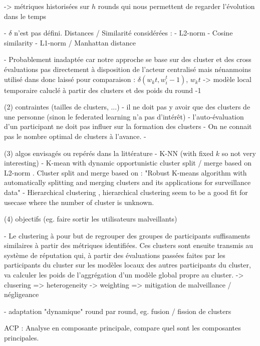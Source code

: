     -> métriques historisées sur $h$ rounds qui nous permettent de regarder l'évolution dans le temps
    
    - $\delta$ n'est pas défini. Distances / Similarité considérées :
        - L2-norm
        - Cosine similarity
        - L1-norm / Manhattan distance

    - Probablement inadaptée car notre approche se base sur des cluster et des cross évaluations pas directement à disposition de l'acteur centralisé mais nénanmoins utilisé dans \cite{wang_reputation-enabled_2021} donc laissé pour comparaison : $\delta (w_k^~t , w_i^t-1 )$, $w_k^~t$ -> modèle local temporaire caluclé à partir des clusters et des poids du round -1

(2) contraintes (tailles de clusters, ...)
    - il ne doit pas y avoir que des clusters de une personne (sinon le federated learning n'a pas d'intérêt)
    - l'auto-évaluation d'un participant ne doit pas influer sur la formation des clusters
    - On ne connait pas le nombre optimal de clusters à l'avance. 
    - 

(3) algos envisagés ou repérés dans la littérature
    - K-NN (with fixed $k$ so not very interesting)
    - K-mean with dynamic opportunistic cluster split / merge based on L2-norm \cite{chen_zero_2021}. Cluster split and merge based on : "Robust K-means algorithm with automatically splitting and merging clusters and its applications for surveillance data"
    - Hierarchical clustering \cite{briggs_federated_2020}, hierarchical clustering seem to be a  good fit for usecase where the number of cluster is unknown. 
    

(4) objectifs (eg. faire sortir les utilisateurs malveillants)

    - Le clustering à pour but de regrouper des groupes de participants suffisaments similaires à partir des métriques identifiées. Ces clusters sont ensuite transmis au système de réputation qui, à partir des évaluations passées faites par les participants du cluster sur les modèles locaux des autres participants du cluster, va calculer les poids de l'aggrégation d'un modèle global propre au cluster. 
        -> clusering => heterogeneity
        -> weighting => mitigation de malveillance / négligeance
        
    - adaptation "dynamique" round par round, eg. fusion / fission de clusters

ACP : Analyse en composante principale, compare quel sont les composantes principales. 
